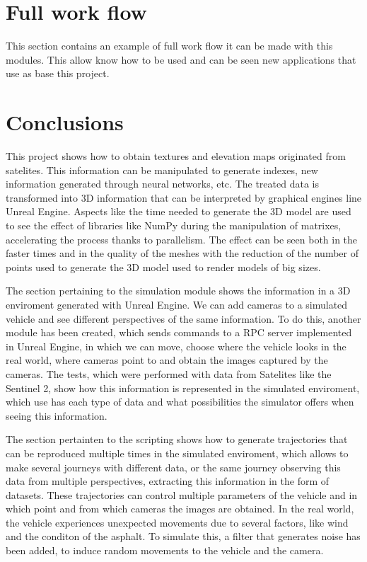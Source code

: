 \documentclass[10pt,a4paper,twocolumn,twoside]{article}
\begin{document}
\section{Full work flow}

This section contains an example of full work flow it can be made with this modules. This allow know how to be used and can be seen new applications that use as base this project.

\section{Conclusions}

This project shows how to obtain textures and elevation maps originated from satelites. This information can be manipulated to generate indexes, new information generated through neural networks, etc. The treated data is transformed into 3D information that can be interpreted by graphical engines line Unreal Engine. Aspects like the time needed to generate the 3D model are used to see the effect of libraries like NumPy during the manipulation of matrixes, accelerating the process thanks to parallelism. The effect can be seen both in the faster times and in the quality of the meshes with the reduction of the number of points used to generate the 3D model used to render models of big sizes.

The section pertaining to the simulation module shows the information in a 3D enviroment generated with Unreal Engine. We can add cameras to a simulated vehicle and see different perspectives of the same information. To do this, another module has been created, which sends commands to a RPC server implemented in Unreal Engine, in which we can move, choose where the vehicle looks in the real world, where cameras point to and obtain the images captured by the cameras.
The tests, which were performed with data from Satelites like the Sentinel 2, show how this information is represented in the simulated enviroment, which use has each type of data and what possibilities the simulator offers when seeing this information.

The section pertainten to the scripting shows how to generate trajectories that can be reproduced multiple times in the simulated enviroment, which allows to make several journeys with different data, or the same journey observing this data from multiple perspectives, extracting this information in the form of datasets. These trajectories can control multiple parameters of the vehicle and in which point and from which cameras the images are obtained. In the real world, the vehicle experiences unexpected movements due to several factors, like wind and the conditon of the asphalt. To simulate this, a filter that generates noise has been added, to induce random movements to the vehicle and the camera.
\end{document}
